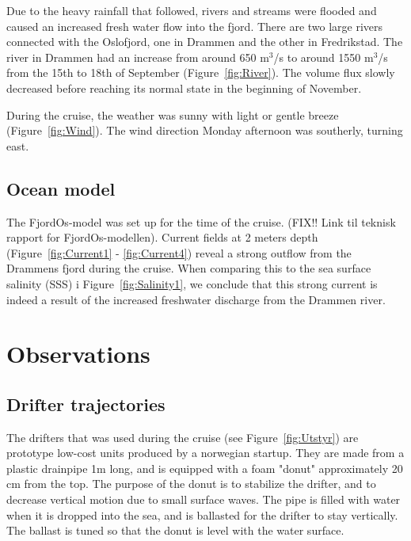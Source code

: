 \documentclass[12pt,a4paper,english]{article}
\begin{document}
Due to the heavy rainfall that followed, rivers and streams were flooded and caused an increased fresh water flow into the fjord. There are two large rivers connected with the Oslofjord, one in Drammen and the other in Fredrikstad. The river in Drammen had an increase from around 650 m$^3$/s to around 1550 m$^3$/s from the 15th to 18th of September (Figure~\ref{fig:River}). The volume flux slowly decreased before reaching its normal state in the beginning of November. 

During the cruise, the weather was sunny with light or gentle breeze (Figure~\ref{fig:Wind}). The wind direction Monday afternoon was southerly, turning east. 

\subsection{Ocean model}
The FjordOs-model was set up for the time of the cruise. (FIX!! Link til teknisk rapport for FjordOs-modellen). Current fields at 2 meters depth (Figure~\ref{fig:Current1} - \ref{fig:Current4}) reveal a strong outflow from the Drammens fjord during the cruise. When comparing this to the sea surface salinity (SSS) i Figure~\ref{fig:Salinity1}, we conclude that this strong current is indeed a result of the increased freshwater discharge from the Drammen river.



\clearpage

\section{Observations}


\subsection{Drifter trajectories}
The drifters that was used during the cruise (see Figure~\ref{fig:Utstyr}) are prototype low-cost units produced by a norwegian startup. They are made from a plastic drainpipe 1m long, and is equipped with a foam "donut" approximately 20 cm from the top. The purpose of the donut is to stabilize the drifter, and to decrease vertical motion due to small surface waves. The pipe is filled with water when it is dropped into the sea, and is  ballasted for the drifter to stay vertically. The ballast is tuned so that the donut is level with the water surface.
\end{document}
